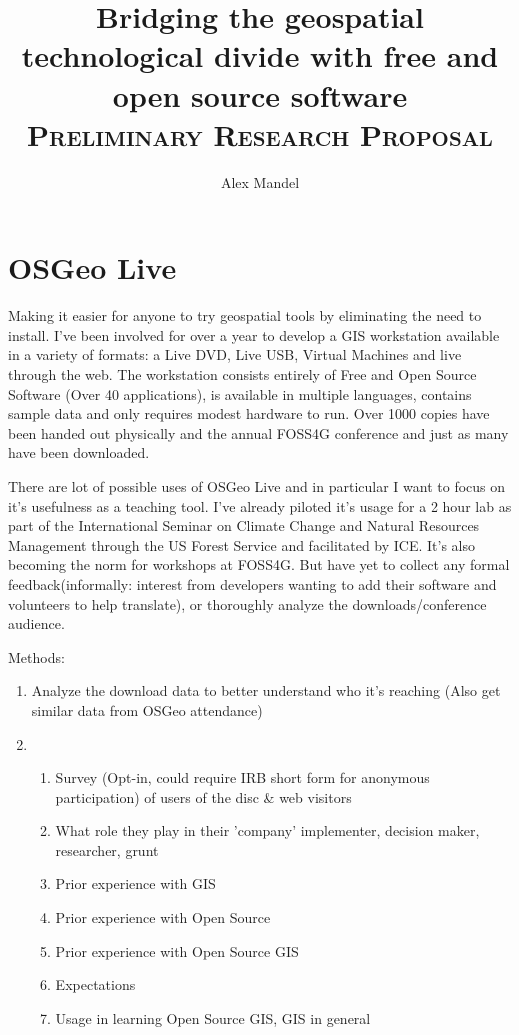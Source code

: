 \documentclass[12pt,letterpaper]{article}
\author{Alex Mandel}
\title{Bridging the geospatial technological divide with free and open source software
\\	
\textsc{\small Preliminary Research Proposal}\\[0.5cm]
}
\begin{document}
\maketitle

\section{OSGeo Live}
Making it easier for anyone to try geospatial tools by eliminating the need to install.
I've been involved for over a year to develop a GIS workstation available in a variety of formats:
a Live DVD, Live USB, Virtual Machines and live through the web. The workstation consists entirely of Free and Open Source Software (Over 40 applications), is available in multiple languages, contains sample data and only requires modest hardware to run. Over 1000 copies have been handed out physically and the annual FOSS4G conference and just as many have been downloaded.

There are lot of possible uses of OSGeo Live and in particular I want to focus on it's usefulness as a teaching tool. I've already piloted it's usage for a 2 hour lab as part of the International Seminar on Climate Change and Natural Resources Management through the US Forest Service and facilitated by ICE. It's also becoming the norm for workshops at FOSS4G. But have yet to collect any formal feedback(informally: interest from developers wanting to add their software and volunteers to help translate), or thoroughly analyze the downloads/conference audience.

Methods:
\begin{enumerate}
\item Analyze the download data to better understand who it's reaching (Also get similar data from OSGeo attendance)
\item 
	\begin{enumerate}
		\item Survey (Opt-in, could require IRB short form for anonymous participation) of users of the disc \& web visitors
		\item What role they play in their 'company' implementer, decision maker, researcher, grunt
		\item Prior experience with GIS
		\item Prior experience with Open Source
		\item Prior experience with Open Source GIS
		\item Expectations
		\item Usage in learning Open Source GIS, GIS in general
	\end{enumerate}
\end{enumerate}
\end{document}
